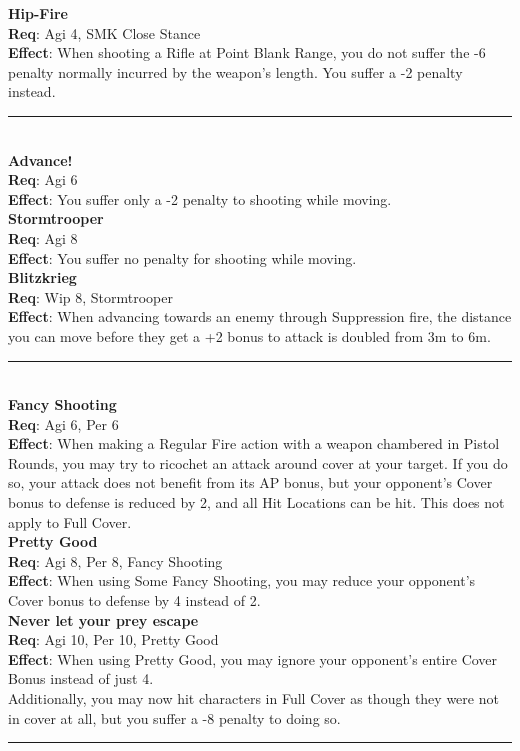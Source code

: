 \documentclass[a4paper, twocolumn, openany]{book}
\newlength{\indentlen}
\newcommand{\tabto}[1]{\setlength{\leftskip}{#1\indentlen}}
\begin{document}
{		\tabto{2}
		{\bfseries Hip-Fire}\\
		{\bfseries Req}: Agi 4, SMK Close Stance\\
		{\bfseries Effect}: When shooting a Rifle at Point Blank Range, you do not suffer the -6
		penalty normally incurred by the weapon’s length. You suffer a -2 penalty
		instead.\\ \hrule\ \\

\tabto{0}
{\bfseries Advance!}\\
{\bfseries Req}: Agi 6\\
{\bfseries Effect}: You suffer only a -2 penalty to shooting while moving.\\

	\tabto{1}
	{\bfseries Stormtrooper}\\
	{\bfseries Req}: Agi 8\\
	{\bfseries Effect}: You suffer no penalty for shooting while moving.\\

		\tabto{2}
		{\bfseries Blitzkrieg}\\
		{\bfseries Req}: Wip 8, Stormtrooper\\
		{\bfseries Effect}: When advancing towards an enemy through Suppression fire, the
		distance you can move before they get a +2 bonus to attack is doubled from 3m
		to 6m.\\ \hrule\ \\

\tabto{0}
{\bfseries Fancy Shooting}\\
{\bfseries Req}: Agi 6, Per 6\\
{\bfseries Effect}:  When making a Regular Fire action with a weapon chambered in Pistol Rounds, you
may try to ricochet an attack around cover at your target. If you do so, your attack does not
benefit from its AP bonus, but your opponent’s Cover bonus to defense is reduced by 2, and all
Hit Locations can be hit. This does not apply to Full Cover.\\

	\tabto{1}
	{\bfseries Pretty Good}\\
	{\bfseries Req}:  Agi 8, Per 8, Fancy Shooting\\
	{\bfseries Effect}:  When using Some Fancy Shooting, you may reduce your opponent’s Cover
	bonus to defense by 4 instead of 2.\\

		\tabto{2}
		{\bfseries Never let your prey escape}\\
		{\bfseries Req}:  Agi 10, Per 10, Pretty Good\\
		{\bfseries Effect}:  When using Pretty Good, you may ignore your opponent’s entire Cover
		Bonus instead of just 4.\\
		Additionally, you may now hit characters in Full Cover as though they were not in
		cover at all, but you suffer a -8 penalty to doing so.\\ \hrule\ \\

}
\end{document}
